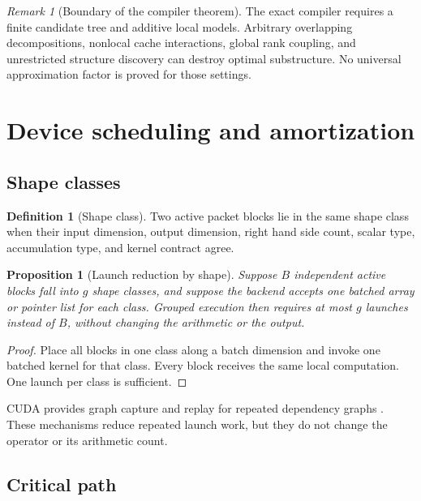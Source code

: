 \documentclass{aomart}
\newtheorem{proposition}[proposition]{Proposition}
\theoremstyle{definition}
\newtheorem{definition}[definition]{Definition}
\theoremstyle{remark}
\newtheorem{remark}[remark]{Remark}
\begin{document}
\begin{remark}[Boundary of the compiler theorem]\label{rem:compiler_boundary}
The exact compiler requires a finite candidate tree and additive local models. Arbitrary overlapping decompositions, nonlocal cache interactions, global rank coupling, and unrestricted structure discovery can destroy optimal substructure. No universal approximation factor is proved for those settings.
\end{remark}

\section{Device scheduling and amortization}\label{sec:scheduling}

\subsection{Shape classes}

\begin{definition}[Shape class]\label{def:shape_class}
Two active packet blocks lie in the same shape class when their input dimension, output dimension, right hand side count, scalar type, accumulation type, and kernel contract agree.
\end{definition}

\begin{proposition}[Launch reduction by shape]\label{prop:shape_launch}
Suppose \(B\) independent active blocks fall into \(g\) shape classes, and suppose the backend accepts one batched array or pointer list for each class. Grouped execution then requires at most \(g\) launches instead of \(B\), without changing the arithmetic or the output.
\end{proposition}

\begin{proof}
Place all blocks in one class along a batch dimension and invoke one batched kernel for that class. Every block receives the same local computation. One launch per class is sufficient.
\end{proof}

CUDA provides graph capture and replay for repeated dependency graphs \cite{NVIDIA2026}. These mechanisms reduce repeated launch work, but they do not change the operator or its arithmetic count.

\subsection{Critical path}
\end{document}

